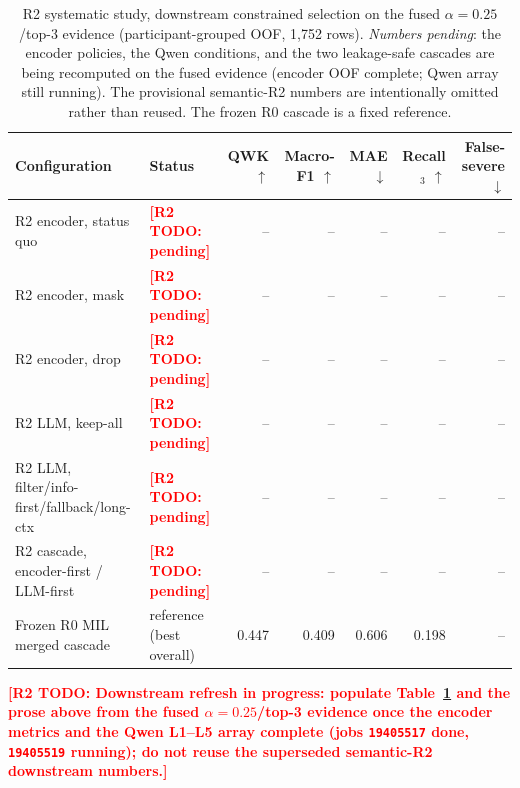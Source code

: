 \documentclass{article}
\newcommand{\todoRtwo}[1]{\textcolor{red}{\textbf{[R2 TODO: #1]}}}
\begin{document}
{\begin{table}[t]
  \caption{\color{red}R2 systematic study, downstream constrained selection on the fused $\alpha=0.25$/top-3 evidence (participant-grouped OOF, 1{,}752 rows). \emph{Numbers pending}: the encoder policies, the Qwen conditions, and the two leakage-safe cascades are being recomputed on the fused evidence (encoder OOF complete; Qwen array still running). The provisional semantic-R2 numbers are intentionally omitted rather than reused. The frozen R0 cascade is a fixed reference.}
  \label{tab:r2}
  \centering
  \scriptsize
  \color{red}
  \begin{tabular}{llrrrrr}
    \toprule
    Configuration & Status & QWK $\uparrow$ & Macro-F1 $\uparrow$ & MAE $\downarrow$ & Recall$_3$ $\uparrow$ & False-severe $\downarrow$ \\
    \midrule
    R2 encoder, status quo & \todoRtwo{pending} & -- & -- & -- & -- & -- \\
    R2 encoder, mask & \todoRtwo{pending} & -- & -- & -- & -- & -- \\
    R2 encoder, drop & \todoRtwo{pending} & -- & -- & -- & -- & -- \\
    R2 LLM, keep-all & \todoRtwo{pending} & -- & -- & -- & -- & -- \\
    R2 LLM, filter/info-first/fallback/long-ctx & \todoRtwo{pending} & -- & -- & -- & -- & -- \\
    R2 cascade, encoder-first / LLM-first & \todoRtwo{pending} & -- & -- & -- & -- & -- \\
    \midrule
    Frozen R0 MIL merged cascade & reference (best overall) & 0.447 & 0.409 & 0.606 & 0.198 & -- \\
    \bottomrule
  \end{tabular}
\end{table}
}%
\todoRtwo{Downstream refresh in progress: populate Table~\ref{tab:r2} and the prose above from the fused $\alpha=0.25$/top-3 evidence once the encoder metrics and the Qwen L1--L5 array complete (jobs \texttt{19405517} done, \texttt{19405519} running); do not reuse the superseded semantic-R2 downstream numbers.}
\end{document}

